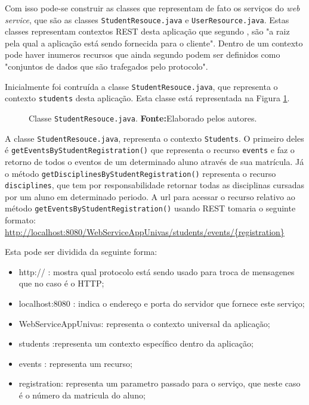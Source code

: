 	\par Com isso pode-se construir as classes que representam de fato os serviços
do \textit{web service}, que são as classes \texttt{StudentResouce.java} e
\texttt{UserResource.java}. Estas classes representam contextos REST desta
aplicação que segundo , são "a raiz pela qual a
aplicação está sendo fornecida para o cliente". Dentro de um contexto pode haver
inumeros recursos que ainda segundo  podem ser
definidos como "conjuntos de dados que são trafegados pelo protocolo".

	\par Inicialmente foi contruída a classe \texttt{StudentResouce.java}, que
representa o contexto \texttt{students} desta aplicação. Esta classe está
representada na Figura \ref{fig:desws25_1}.

	\begin{figure}[h!]
		
		\caption[Classe StudentResouce.java]{Classe \texttt{StudentResouce.java}.
		\textbf{Fonte:}Elaborado pelos autores.}
		\label{fig:desws25_1}
	\end{figure}
		
	\par A classe \texttt{StudentResouce.java}, representa o contexto
\texttt{Students}. O primeiro deles é \texttt{getEventsByStudentRegistration()}
que representa o recurso \texttt{events} e faz o retorno de todos o eventos de
um determinado aluno através de sua matrícula. Já o método
\texttt{getDisciplinesByStudentRegistration()} representa o recurso
\texttt{disciplines}, que tem por responsabilidade retornar todas as
disciplinas cursadas por um aluno em determinado periodo. A url para acessar o recurso
relativo ao método \texttt{getEventsByStudentRegistration()} usando REST
tomaria o seguinte formato:\\
\url{http://localhost:8080/WebServiceAppUnivas/students/events/{registration}}
	
	\par Esta pode ser dividida da seguinte forma:

	\begin{itemize}
	  \item http:// : mostra qual protocolo está sendo usado para troca de
	  mensagenes que no caso é o HTTP;
	  \item localhost:8080 : indica o endereço e porta do servidor que fornece este
	  serviço;
	  \item WebServiceAppUnivas: representa o contexto universal da aplicação; 
	  \item students :representa um contexto específico dentro da aplicação;
	  \item events : representa um recurso;
	  \item registration: representa um parametro passado para o serviço, que
	  neste caso é o número da matricula do aluno;
	\end{itemize}

